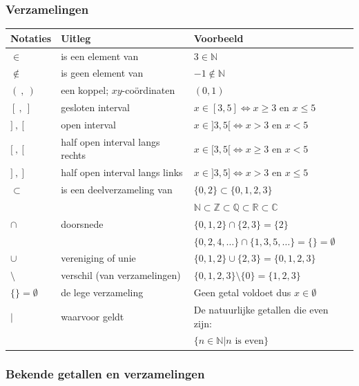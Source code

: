 \subsubsection{Verzamelingen}

\begin{center}
	\begin{tabular}{lll}
		Notaties & Uitleg & Voorbeeld \\
		\hline
		$\in$ & is een element van & $3 \in \mathbb{N}$ \\
		$\notin$ & is geen element van & $-1 \notin \mathbb{N}$ \\
		$(\ ,\ )$ & een koppel; $xy$-co\"ordinaten & $(0,1)$ \\
		$[\ ,\ ]$ & gesloten interval & $x \in [3,5]\iff x\ge 3 \text{ en } x \le 5$\\
		$]\ ,\ [$ & open interval & $x \in ]3,5[\iff x> 3 \text{ en } x < 5$\\
		$[\ ,\ [$ & half open interval langs rechts & $x \in [3,5[\iff x\ge 3 \text{ en } x < 5$\\
		$]\ ,\ ]$ & half open interval langs links & $x \in ]3,5]\iff x> 3 \text{ en } x \le 5$\\
		$\subset$ & is een deelverzameling van & $\{0,2\} \subset \{0,1,2,3\}$ \\
		& & $\mathbb{N} \subset \mathbb{Z} \subset \mathbb{Q} \subset \mathbb{R} \subset \mathbb{C}$ \\
		$\cap$ & doorsnede & $\{0,1,2\} \cap \{2,3\} = \{2\}$\\
		& & $\{0,2,4,\ldots\}\cap\{1,3,5,\ldots\}=\{\}=\emptyset$\\
		$\cup$ & vereniging of unie & $\{0,1,2\}\cup \{2,3\} = \{0,1,2,3\}$\\
		$\setminus$ & verschil (van verzamelingen) & $\{0,1,2,3\} \setminus \{0\} = \{1,2,3\}$ \\
		$\{\}=\emptyset$ & de lege verzameling & Geen getal voldoet dus $x \in \emptyset$ \\
		$|$ & waarvoor geldt & De natuurlijke getallen die even zijn: \\
		& & $\{n \in \mathbb{N} | n \text{ is even}\}$
	\end{tabular}
\end{center}

\subsubsection{Bekende getallen en verzamelingen}

